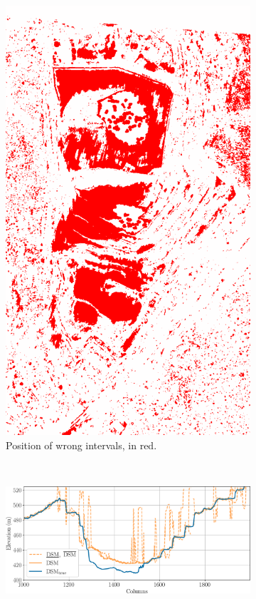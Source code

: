 \begin{figure}
\begin{subfigure}[t]{0.33\linewidth}
        \includegraphics[width=\linewidth]{Images/Chap_6/Carriere_wrong_intervals_Monaco.png}
        \caption{Position of wrong intervals, in red.}
        \label{fig:Carriere_wrong_intervals}
    \end{subfigure}\\
    \begin{subfigure}[t]{\linewidth}
        \flushright
        \includegraphics[width=\linewidth]{Images/Chap_6/Carriere_row_800.png}

\end{subfigure}
\end{figure}

